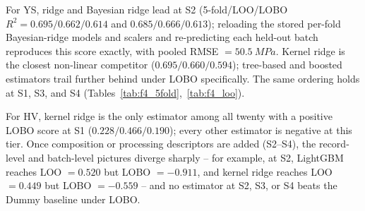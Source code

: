 \documentclass[a4paper,11pt]{article}
\begin{document}
For YS, ridge and Bayesian ridge lead at S2 (5-fold/LOO/LOBO $R^2=0.695/0.662/0.614$ and $0.685/0.666/0.613$); reloading the stored per-fold Bayesian-ridge models and scalers and re-predicting each held-out batch reproduces this score exactly, with pooled RMSE $=\SI{50.5}{MPa}$. Kernel ridge is the closest non-linear competitor ($0.695/0.660/0.594$); tree-based and boosted estimators trail further behind under LOBO specifically. The same ordering holds at S1, S3, and S4 (Tables~\ref{tab:f4_5fold},~\ref{tab:f4_loo}).

For HV, kernel ridge is the only estimator among all twenty with a positive LOBO score at S1 ($0.228/0.466/0.190$); every other estimator is negative at this tier. Once composition or processing descriptors are added (S2--S4), the record-level and batch-level pictures diverge sharply -- for example, at S2, LightGBM reaches LOO $=0.520$ but LOBO $=-0.911$, and kernel ridge reaches LOO $=0.449$ but LOBO $=-0.559$ -- and no estimator at S2, S3, or S4 beats the Dummy baseline under LOBO.
\end{document}
